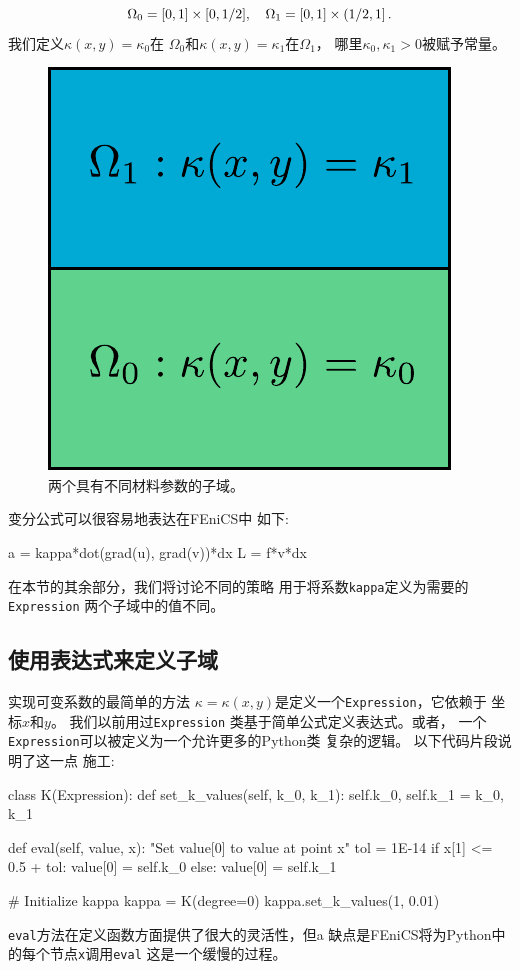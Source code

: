 \begin{equation*}
\Omega_0 = [0, 1]\times [0,1/2],\quad
\Omega_1 = [0, 1]\times (1/2,1]\thinspace .
\end{equation*}
我们定义$\kappa(x,y)=\kappa_0$在
$\Omega_0$和$\kappa(x,y)=\kappa_1$在$\Omega_1$，
哪里$\kappa_0, \kappa_1 > 0$被赋予常量。

\begin{figure}[!ht]  %
 \centerline{\includegraphics[width=0.5\linewidth]{fig/subdomains.pdf}}
 \caption{
 两个具有不同材料参数的子域。\label{fig:subdomains}
 }
\end{figure}

变分公式可以很容易地表达在FEniCS中
如下:
\begin{python}
a = kappa*dot(grad(u), grad(v))*dx
L = f*v*dx
\end{python}
在本节的其余部分，我们将讨论不同的策略
用于将系数\texttt{kappa}定义为需要的\texttt{Expression}
两个子域中的值不同。

\subsection{使用表达式来定义子域}

实现可变系数的最简单的方法
$\kappa = \kappa(x,y)$是定义一个\texttt{Expression}，它依赖于
坐标$x$和$y$。 我们以前用过\texttt{Expression}
类基于简单公式定义表达式。或者，
一个\texttt{Expression}可以被定义为一个允许更多的Python类
复杂的逻辑。 以下代码片段说明了这一点
施工:

\begin{python}
class K(Expression):
    def set_k_values(self, k_0, k_1):
        self.k_0, self.k_1 = k_0, k_1

    def eval(self, value, x):
        "Set value[0] to value at point x"
        tol = 1E-14
        if x[1] <= 0.5 + tol:
            value[0] = self.k_0
        else:
            value[0] = self.k_1

# Initialize kappa
kappa = K(degree=0)
kappa.set_k_values(1, 0.01)
\end{python}
\texttt{eval}方法在定义函数方面提供了很大的灵活性，但a
缺点是FEniCS将为Python中的每个节点\texttt{x}调用\texttt{eval}
这是一个缓慢的过程。

